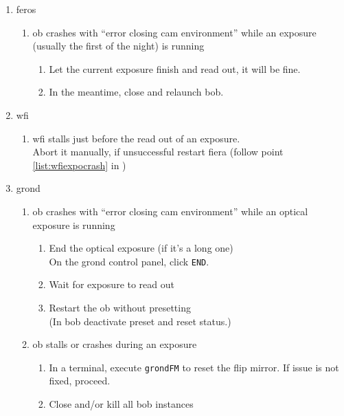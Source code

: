 \documentclass[11pt,fleqn,a4paper]{book}
\begin{document}
\begin{enumerate}
  \item \gls{feros} 
    \begin{enumerate}
       \item \gls{ob} crashes with ``error closing cam \gls{environment}''
          while an exposure (usually the first of the night) is running
          \begin{enumerate}
            \item Let the current exposure finish and read out, it will be fine.
            \item In the meantime, close and relaunch \gls{bob}.
          \end{enumerate}
    \end{enumerate}
  \item \gls{wfi}
    \begin{enumerate}
       \item \gls{wfi} \gls{stall}s just before the read out of an exposure.\\
             Abort it manually, if unsuccessful restart \gls{fiera} (follow point \ref{list:wfiexpocrash} in )
    \end{enumerate}
  \item \gls{grond}
    \begin{enumerate}
       \item \gls{ob} crashes with ``error closing cam environment''
          while an optical exposure is running
          \begin{enumerate}
            \item End the optical exposure (if it's a long one)\\
                  On the grond control panel, click \texttt{END}.
            \item Wait for exposure to read out
            \item Restart the \gls{ob} without \gls{preset}ting\\
                  (In \gls{bob} deactivate preset and reset status.)
          \end{enumerate}
       \item \gls{ob} \gls{stall}s or crashes during an exposure
	      \begin{enumerate}
             \item In a terminal, execute \texttt{grondFM} to reset the \gls{flip mirror}. If issue is not fixed, proceed.
             \item Close and/or kill all {bob} instances\\

\end{enumerate}
\end{enumerate}
\end{enumerate}
\end{document}
